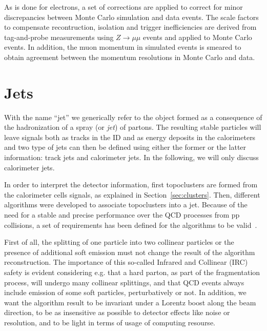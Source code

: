 As is done for electrons, a set of corrections are applied to correct for minor
discrepancies between Monte Carlo simulation and data events.
The scale factors to compensate recontruction, isolation and trigger 
inefficiencies are derived from tag-and-probe measurements using $Z\to \mu\mu$ events
and applied to Monte Carlo events. In addition, the muon momentum
in simulated events is smeared to obtain agreement between the momentum
resolutions in Monte Carlo and data.


\section{Jets}\label{sec:jets}

With the name ``jet'' we generically refer to the object formed as a consequence
of the hadronization of a spray (or {\it jet}) of partons. The resulting stable particles
will leave signals both as tracks in the ID and as energy deposits in the calorimeters
and two type of jets can then be defined using either the former or the latter information:
track jets and calorimeter jets. In the following, we will only discuss calorimeter jets.

In order to interpret the detector information, first topoclusters are formed from the
calorimeter cells signals, as explained in Section~\ref{sec:clusters}. Then, different
algorithms were developed to associate topoclusters into a jet. Because of the
need for a stable and precise performance over the QCD processes from pp collisions,
a set of requirements has been defined for the algorithms to be valid~\cite{Salam:2009jx}.

First of all, the splitting of one particle into two collinear particles 
or the presence of additional soft emission must not change the 
result of the algorithm reconstruction.
The importance of this so-called Infrared and Collinear (IRC) safety is evident considering e.g. 
that a hard parton, as part of the fragmentation process, will undergo many collinear splittings,
and that QCD events always include emission of some soft particles, perturbatively or not.
In addition, we want the algorithm result to be invariant under a Lorentz boost along the beam direction,
to be as insensitive as possible to detector effects like noise or resolution, and to be light in terms
of  usage of computing resourse.

